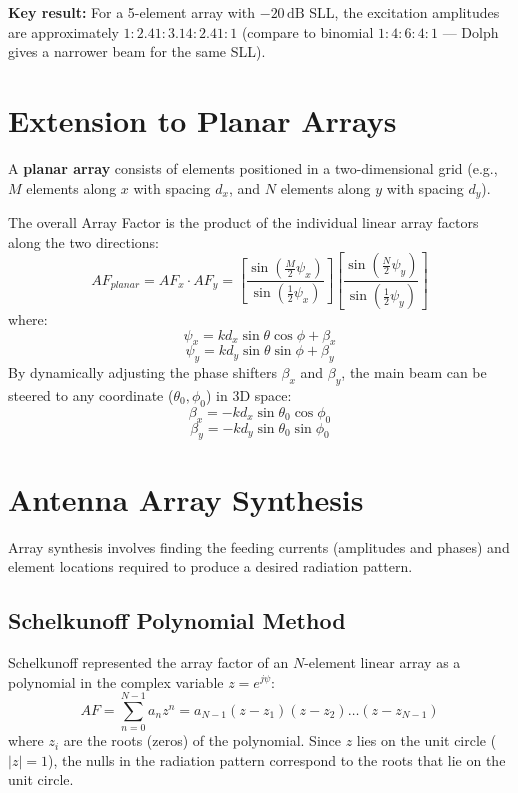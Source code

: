 \documentclass[12pt,a4paper]{article}
\begin{document}
\textbf{Key result:} For a 5-element array with $-20\,\text{dB}$ SLL, the excitation amplitudes are approximately $1 : 2.41 : 3.14 : 2.41 : 1$ (compare to binomial $1:4:6:4:1$ — Dolph gives a narrower beam for the same SLL).

\section{Extension to Planar Arrays}

A \textbf{planar array} consists of elements positioned in a two-dimensional grid (e.g., $M$ elements along $x$ with spacing $d_x$, and $N$ elements along $y$ with spacing $d_y$).

The overall Array Factor is the product of the individual linear array factors along the two directions:
\[
AF_{planar} = AF_x \cdot AF_y = \left[ \frac{\sin\left(\frac{M}{2}\psi_x\right)}{\sin\left(\frac{1}{2}\psi_x\right)} \right] \left[ \frac{\sin\left(\frac{N}{2}\psi_y\right)}{\sin\left(\frac{1}{2}\psi_y\right)} \right]
\]
where:
\[
\psi_x = k d_x \sin\theta \cos\phi + \beta_x
\]
\[
\psi_y = k d_y \sin\theta \sin\phi + \beta_y
\]
By dynamically adjusting the phase shifters $\beta_x$ and $\beta_y$, the main beam can be steered to any coordinate ($\theta_0, \phi_0$) in 3D space:
\[
\beta_x = -k d_x \sin\theta_0 \cos\phi_0
\]
\[
\beta_y = -k d_y \sin\theta_0 \sin\phi_0
\]

\section{Antenna Array Synthesis}

Array synthesis involves finding the feeding currents (amplitudes and phases) and element locations required to produce a desired radiation pattern.

\subsection{Schelkunoff Polynomial Method}
Schelkunoff represented the array factor of an $N$-element linear array as a polynomial in the complex variable $z = e^{j\psi}$:
\[
AF = \sum_{n=0}^{N-1} a_n z^n = a_{N-1} (z - z_1)(z - z_2) \dots (z - z_{N-1})
\]
where $z_i$ are the roots (zeros) of the polynomial. Since $z$ lies on the unit circle ($|z| = 1$), the nulls in the radiation pattern correspond to the roots that lie on the unit circle.
\end{document}
